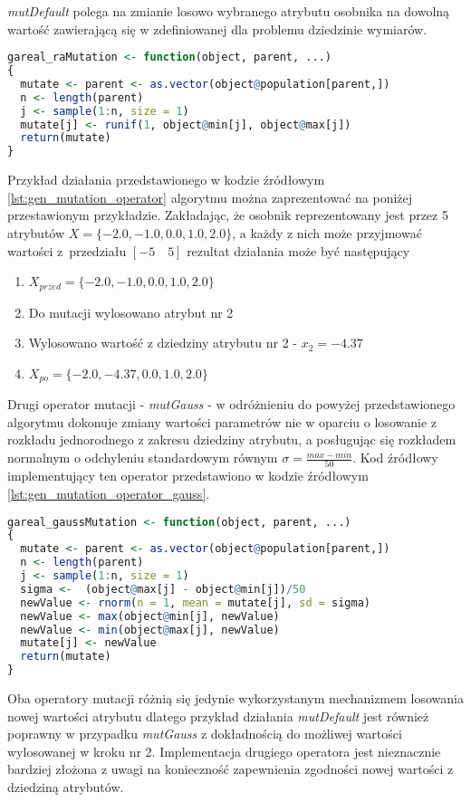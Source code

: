 \par
\emph{mutDefault} polega na zmianie losowo wybranego atrybutu osobnika na dowolną wartość zawierającą się w zdefiniowanej dla problemu dziedzinie wymiarów. 
\begin{lstlisting}[caption=Domyślny operator mutacji z pakietu \emph{GA} dla języka \emph{R}, label=lst:gen_mutation_operator, mathescape, breaklines=true, language=R]
gareal_raMutation <- function(object, parent, ...)
{
  mutate <- parent <- as.vector(object@population[parent,])
  n <- length(parent)
  j <- sample(1:n, size = 1)
  mutate[j] <- runif(1, object@min[j], object@max[j])
  return(mutate)
}
\end{lstlisting}
\par
Przykład działania przedstawionego w kodzie źródłowym \ref{lst:gen_mutation_operator} algorytmu można zaprezentować na poniżej przestawionym przykładzie. Zakładając, że osobnik reprezentowany jest przez 5 atrybutów $X=\lbrace-2.0,-1.0,0.0,1.0,2.0\rbrace$, a każdy z nich może przyjmować wartości z~przedziału $[-5\quad5]$ rezultat działania może być następujący
\begin{enumerate}
\item $X_{przed}=\lbrace-2.0,-1.0,0.0,1.0,2.0\rbrace$
\item Do mutacji wylosowano atrybut nr 2
\item Wylosowano wartość z dziedziny atrybutu nr 2 - $x_2=-4.37$
\item $X_{po}=\lbrace-2.0,-4.37,0.0,1.0,2.0\rbrace$
\end{enumerate}

\par
Drugi operator mutacji - \emph{mutGauss} - w odróżnieniu do powyżej przedstawionego algorytmu dokonuje zmiany wartości parametrów nie w oparciu o losowanie z rozkładu jednorodnego z zakresu dziedziny atrybutu, a posługując się rozkładem normalnym o odchyleniu standardowym równym $\sigma=\frac{max - min}{50}$. Kod źródłowy implementujący ten operator przedstawiono w kodzie źródłowym \ref{lst:gen_mutation_operator_gauss}.
\begin{lstlisting}[caption=Operator mutacji zmieniający wartości zgodnie z rozkładem normalnym, label=lst:gen_mutation_operator_gauss, mathescape, breaklines=true, language=R]
gareal_gaussMutation <- function(object, parent, ...)
{
  mutate <- parent <- as.vector(object@population[parent,])
  n <- length(parent)
  j <- sample(1:n, size = 1)
  sigma <-  (object@max[j] - object@min[j])/50
  newValue <- rnorm(n = 1, mean = mutate[j], sd = sigma)
  newValue <- max(object@min[j], newValue)
  newValue <- min(object@max[j], newValue)
  mutate[j] <- newValue
  return(mutate)
}
\end{lstlisting}
\par
Oba operatory mutacji różnią się jedynie wykorzystanym mechanizmem losowania nowej wartości atrybutu dlatego przykład działania \emph{mutDefault} jest również poprawny w przypadku \emph{mutGauss} z dokładnością do możliwej wartości wylosowanej w kroku nr 2. Implementacja  drugiego operatora jest nieznacznie bardziej złożona z uwagi na konieczność zapewnienia zgodności nowej wartości z dziedziną atrybutów.

